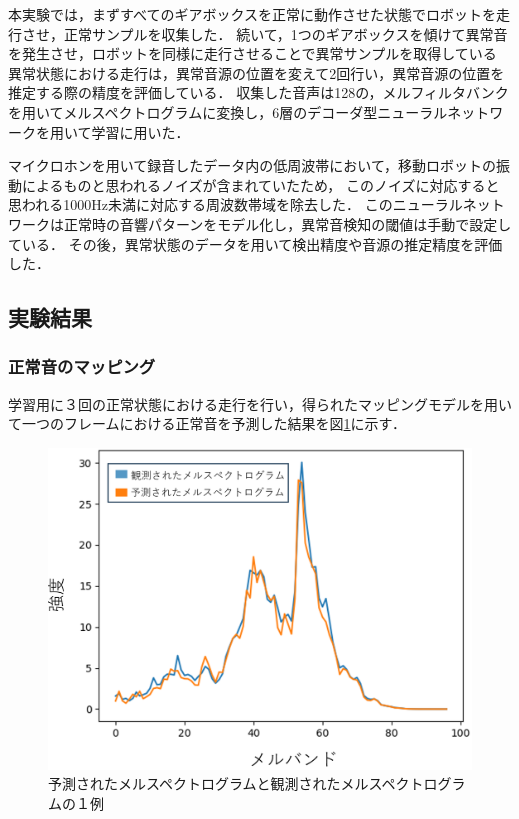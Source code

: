 \documentclass[../main]{subfiles}
\begin{document}
本実験では，まずすべてのギアボックスを正常に動作させた状態でロボットを走行させ，正常サンプルを収集した．
続いて，1つのギアボックスを傾けて異常音を発生させ，ロボットを同様に走行させることで異常サンプルを取得している
異常状態における走行は，異常音源の位置を変えて2回行い，異常音源の位置を推定する際の精度を評価している．
収集した音声は128の，メルフィルタバンクを用いてメルスペクトログラムに変換し，6層のデコーダ型ニューラルネットワークを用いて学習に用いた．

マイクロホンを用いて録音したデータ内の低周波帯において，移動ロボットの振動によるものと思われるノイズが含まれていたため，
このノイズに対応すると思われる1000Hz未満に対応する周波数帯域を除去した．
このニューラルネットワークは正常時の音響パターンをモデル化し，異常音検知の閾値は手動で設定している．
その後，異常状態のデータを用いて検出精度や音源の推定精度を評価した．

\subsection{実験結果} \label{subsec:vexp_ref_result}

\subsubsection{正常音のマッピング} \label{subsubsec:normal_mapping}
学習用に３回の正常状態における走行を行い，得られたマッピングモデルを用いて一つのフレームにおける正常音を予測した結果を図\ref{fig:comparison_pre_mel}に示す．


\begin{figure}[t]
  \centering
  \includegraphics[keepaspectratio, width=0.7\linewidth]{chap4/comparison_pre_mel.png}
  \caption{予測されたメルスペクトログラムと観測されたメルスペクトログラムの１例}
  \label{fig:comparison_pre_mel}
\end{figure}
\end{document}
